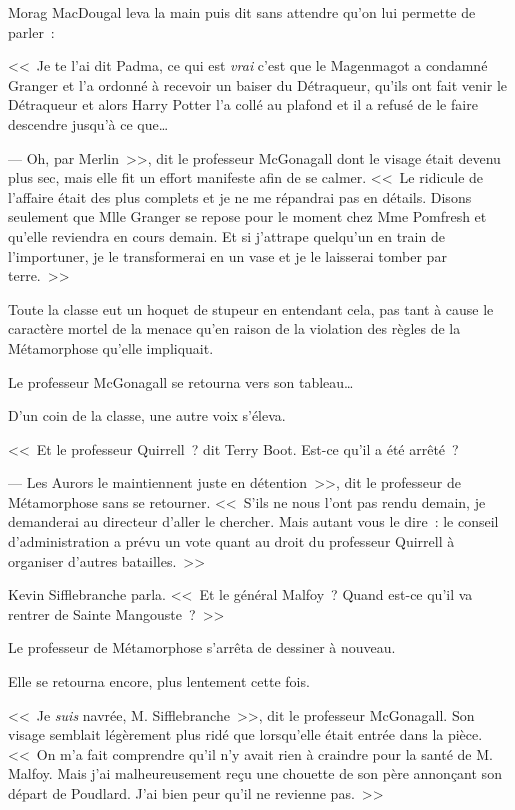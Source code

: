 Morag MacDougal leva la main puis dit sans attendre qu'on lui permette de parler~:

<<~Je te l'ai dit Padma, ce qui est \emph{vrai} c'est que le Magenmagot a condamné Granger et l'a ordonné à recevoir un baiser du Détraqueur, qu'ils ont fait venir le Détraqueur et alors Harry Potter l'a collé au plafond et il a refusé de le faire descendre jusqu'à ce que… 

---  Oh, par Merlin~>>, dit le professeur McGonagall dont le visage était devenu plus sec, mais elle fit un effort manifeste afin de se calmer. <<~Le ridicule de l'affaire était des plus complets et je ne me répandrai pas en détails. Disons seulement que Mlle Granger se repose pour le moment chez Mme Pomfresh et qu'elle reviendra en cours demain. Et si j'attrape quelqu'un en train de l'importuner, je le transformerai en un vase et je le laisserai tomber par terre.~>>

Toute la classe eut un hoquet de stupeur en entendant cela, pas tant à cause le caractère mortel de la menace qu'en raison de la violation des règles de la Métamorphose qu'elle impliquait.

Le professeur McGonagall se retourna vers son tableau…

D'un coin de la classe, une autre voix s'éleva.

<<~Et le professeur Quirrell~? dit Terry Boot. Est-ce qu'il a été arrêté~? 

---  Les Aurors le maintiennent juste en détention~>>, dit le professeur de Métamorphose sans se retourner. <<~S'ils ne nous l'ont pas rendu demain, je demanderai au directeur d'aller le chercher. Mais autant vous le dire~: le conseil d'administration a prévu un vote quant au droit du professeur Quirrell à organiser d'autres batailles.~>>

Kevin Sifflebranche parla. <<~Et le général Malfoy~? Quand est-ce qu'il va rentrer de Sainte Mangouste~?~>>

Le professeur de Métamorphose s'arrêta de dessiner à nouveau.

Elle se retourna encore, plus lentement cette fois.

<<~Je \emph{suis} navrée, M. Sifflebranche~>>, dit le professeur McGonagall. Son visage semblait légèrement plus ridé que lorsqu'elle était entrée dans la pièce. <<~On m'a fait comprendre qu'il n'y avait rien à craindre pour la santé de M. Malfoy. Mais j'ai malheureusement reçu une chouette de son père annonçant son départ de Poudlard. J'ai bien peur qu'il ne revienne pas.~>>
